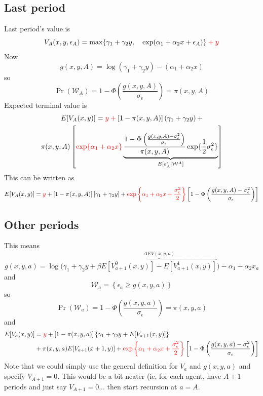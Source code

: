 \documentclass[11pt,letterpaper]{article}
\newcommand*{\mathcolor}{}
\def\mathcolor#1#{\mathcoloraux{#1}}
\newcommand*{\mathcoloraux}[3]{%
  \protect\leavevmode
  \begingroup
    \color#1{#2}#3%
  \endgroup
}
\begin{document}
\subsection{Last period}

Last period's value is
\[
V_A(x,y,\epsilon_A) = \max \{ \gamma_1 + \gamma_2 y, \quad \exp(\alpha_1 + \alpha_2 x + \epsilon_A) \} \mathcolor{red}{+ y}
\]
Now
\[
g(x,y,A) = \log(\gamma_1 + \gamma_2 y) - (\alpha_1 + \alpha_2 x)
\]
so 
\[
\Pr(\mathcal W_A) = 1- \Phi\left(\frac{g(x,y,A)}{\sigma_\epsilon} \right) = \pi(x,y,A)
\]
Expected terminal value is
\begin{multline*}
E[V_A(x,y)] = \mathcolor{red}{y +}
    [1-\pi(x,y,A)]\left(\gamma_1 + \gamma_2 y\right)  + \\
    \pi(x,y,A)    \left[\mathcolor{red}{\exp\{\alpha_1 + \alpha_2 x\}} \underbrace{
    \frac{ 1-\Phi\left( \frac{g(x,y,A) - \sigma_\epsilon^2}{\sigma_\epsilon} \right)}
    {\pi(x,y,A)} \exp\{\frac{1}{2}\sigma^2_\epsilon\} }_{E[e^\epsilon_A|\mathcal W^A]} \right]
\end{multline*}
This can be written as
\[
E[V_A(x,y)] = \mathcolor{red}{y} + 
    [1-\pi(x,y,A)]\left[\gamma_1 + \gamma_2 y\right]  + 
    \mathcolor{red}{ \exp\left\{\alpha_1 + \alpha_2 x + \frac{\sigma_\epsilon^2}{2}\right\}}
    \left[1-\Phi\left( \frac{g(x,y,A) - \sigma_\epsilon^2}{\sigma_\epsilon} \right)\right] 
\]

\subsection{Other periods}
This means
\[
    g(x,y,a) = \log \bigg( \gamma_1 + \gamma_2 y + \beta\overbrace{E[V_{a+1}^0(x,y)] - E[V_{a+1}^1(x,y)]}^{\Delta EV(x,y,a)} \bigg) - \alpha_1 - \alpha_2 x_a 
\]
and
\[
\mathcal W_a = \left\{\epsilon_a \geq g(x,y,a) \right\}
\]
so
\[
\Pr(\mathcal W_a) = 1- \Phi\left(\frac{g(x,y,a)}{\sigma_\epsilon} \right) = \pi(x,y,a)
\]
and
\begin{align*}
E[V_a(x,y)] 
&= \mathcolor{red}{y}  
+ [1-\pi(x,y,a)]\left\{\gamma_1 + \gamma_2 y + E[V_{a+1}(x,y)] \right\}  \\ 
&+ \pi(x,y,a)E[V_{a+1}(x+1,y)] + \mathcolor{red}{ \exp\left\{\alpha_1 + \alpha_2 x + \frac{\sigma_\epsilon^2}{2}\right\}}
    \left[1-\Phi\left( \frac{g(x,y,a) - \sigma_\epsilon^2}{\sigma_\epsilon} \right)\right] 
\end{align*}
Note that we could simply use the general definition for $V_a$ and $g(x,y,a)$ and specify $V_{A+1} = 0$. This would be a bit neater (ie, for each agent, have $A+1$ periods and just say $V_{A+1} = 0$... then start recursion at $a=A$.  
\end{document}
